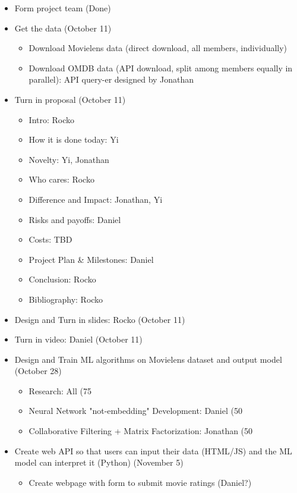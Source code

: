 \begin{itemize}
  \item Form project team (Done)
  \item Get the data (October 11)
    \begin{itemize}
      \item Download Movielens data (direct download, all members, individually) 
      \item Download OMDB data (API download, split among members equally in parallel): API query-er designed by Jonathan
    \end{itemize}
  \item Turn in proposal (October 11)
    \begin{itemize}
      \item Intro: Rocko
      \item How it is done today: Yi
      \item Novelty: Yi, Jonathan
      \item Who cares: Rocko
      \item Difference and Impact: Jonathan, Yi
      \item Risks and payoffs: Daniel
      \item Costs: TBD
      \item Project Plan \& Milestones: Daniel
      \item Conclusion: Rocko
      \item Bibliography: Rocko
    \end{itemize}
  \item Design and Turn in slides: Rocko (October 11)
  \item Turn in video: Daniel (October 11)
  \item Design and Train ML algorithms on Movielens dataset and output model (October 28)
    \begin{itemize}
      \item Research: All (75%
      \item Neural Network "not-embedding" Development: Daniel (50%
      \item Collaborative Filtering + Matrix Factorization: Jonathan (50%
    \end{itemize}
  \item Create web API so that users can input their data (HTML/JS) and the ML model can interpret it (Python) (November 5)
    \begin{itemize}
      \item Create webpage with form to submit movie ratings (Daniel?)

\end{itemize}
\end{itemize}
